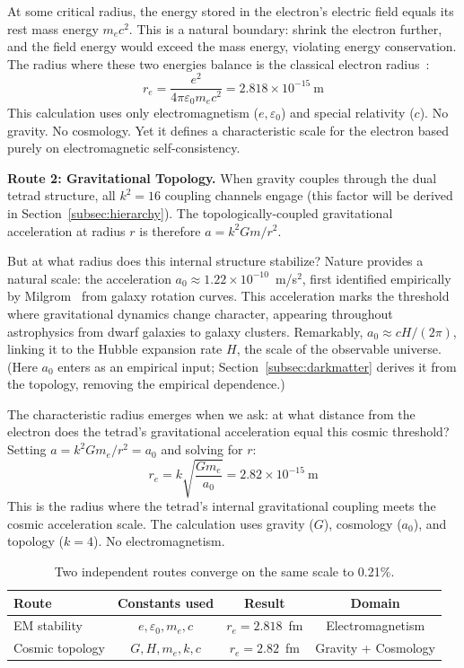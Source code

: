 \documentclass[aps,prd,preprint,superscriptaddress,showpacs,preprintnumbers,amsmath,amssymb,nofootinbib]{revtex4-2}
\begin{document}
At some critical radius, the energy stored in the electron's electric field equals its rest mass energy $m_e c^2$. This is a natural boundary: shrink the electron further, and the field energy would exceed the mass energy, violating energy conservation. The radius where these two energies balance is the classical electron radius~\cite{jackson1999}:
\begin{equation}
r_e = \frac{e^2}{4\pi\varepsilon_0 m_e c^2} = 2.818 \times 10^{-15}~\text{m}
\end{equation}
This calculation uses only electromagnetism ($e, \varepsilon_0$) and special relativity ($c$). No gravity. No cosmology. Yet it defines a characteristic scale for the electron based purely on electromagnetic self-consistency.

\textbf{Route 2: Gravitational Topology.} When gravity couples through the dual tetrad structure, all $k^2 = 16$ coupling channels engage (this factor will be derived in Section~\ref{subsec:hierarchy}). The topologically-coupled gravitational acceleration at radius $r$ is therefore $a = k^2 Gm/r^2$.

But at what radius does this internal structure stabilize? Nature provides a natural scale: the acceleration $a_0 \approx 1.22 \times 10^{-10}$~m/s$^2$, first identified empirically by Milgrom~\cite{milgrom1983} from galaxy rotation curves. This acceleration marks the threshold where gravitational dynamics change character, appearing throughout astrophysics from dwarf galaxies to galaxy clusters. Remarkably, $a_0 \approx cH/(2\pi)$, linking it to the Hubble expansion rate $H$, the scale of the observable universe. (Here $a_0$ enters as an empirical input; Section~\ref{subsec:darkmatter} derives it from the topology, removing the empirical dependence.)

The characteristic radius emerges when we ask: at what distance from the electron does the tetrad's gravitational acceleration equal this cosmic threshold? Setting $a = k^2 Gm_e/r^2 = a_0$ and solving for $r$:
\begin{equation}
r_e = k\sqrt{\frac{Gm_e}{a_0}} = 2.82 \times 10^{-15}~\text{m}
\end{equation}
This is the radius where the tetrad's internal gravitational coupling meets the cosmic acceleration scale. The calculation uses gravity ($G$), cosmology ($a_0$), and topology ($k = 4$). No electromagnetism.

\begin{table}[H]
\centering
\begin{tabular*}{0.95\textwidth}{@{\extracolsep{\fill}} lccc @{}}
\toprule
\textbf{Route} & \textbf{Constants used} & \textbf{Result} & \textbf{Domain} \\
\midrule
EM stability & $e, \varepsilon_0, m_e, c$ & $r_e = 2.818$~fm & Electromagnetism \\
Cosmic topology & $G, H, m_e, k, c$ & $r_e = 2.82$~fm & Gravity + Cosmology \\
\bottomrule
\end{tabular*}
\caption{Two independent routes converge on the same scale to 0.21\%.}
\label{tab:convergence}
\end{table}
\end{document}
